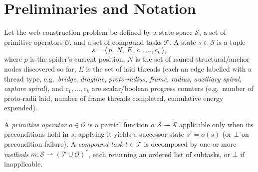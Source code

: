 \providecommand{\origstick}[2]{\mathrm{stick}_{#1}^{\mathrm{#2}}}
\providecommand{\origpath}[1]{\mathrm{path}_{\mathrm{#1}}}

\section{Preliminaries and Notation}
\label{sec:orig-prelim}

Let the web-construction problem be defined by a state space $\mathcal{S}$, a set of primitive operators $\mathcal{O}$, and a set of compound tasks $\mathcal{T}$. A state $s \in \mathcal{S}$ is a tuple
\[
  s = \bigl\langle\, p,\ N,\ E,\ c_1, \dots, c_k \,\bigr\rangle,
\]
where $p$ is the spider's current position, $N$ is the set of named structural/anchor nodes discovered so far, $E$ is the set of laid threads (each an edge labelled with a thread type, e.g.\ \textit{bridge}, \textit{dragline}, \textit{proto-radius}, \textit{frame}, \textit{radius}, \textit{auxiliary spiral}, \textit{capture spiral}), and $c_1, \dots, c_k$ are scalar/boolean progress counters (e.g.\ number of proto-radii laid, number of frame threads completed, cumulative energy expended).

A \textit{primitive operator} $o \in \mathcal{O}$ is a partial function $o : \mathcal{S} \rightharpoonup \mathcal{S}$ applicable only when its preconditions hold in $s$; applying it yields a successor state $s' = o(s)$ (or $\bot$ on precondition failure). A \textit{compound task} $t \in \mathcal{T}$ is decomposed by one or more \textit{methods} $m : \mathcal{S} \rightharpoonup (\mathcal{T} \cup \mathcal{O})^*$, each returning an ordered list of subtasks, or $\bot$ if inapplicable.


